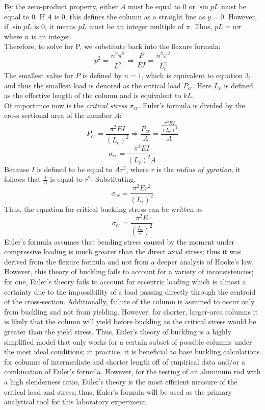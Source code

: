 \documentclass{article}
\begin{document}
    By the zero-product property, either $A$ must be equal to 0 or $\sin pL$ must be equal to 0. If $A$ is 0, this defines the column as a straight line as $y=0$. However, if $\sin pL$ is 0, it means $pL$ must be an integer multiple of $\pi$. Thus, $pL = n \pi$ where $n$ is an integer. \\
    Therefore, to solve for P, we substitute back into the flexure formula:
    \[ p^2 = \frac{n^2 \pi^2}{L^2} \Rightarrow \frac{P}{EI} = \frac{n^2 \pi^2}{L_{e}^2}\]
    The smallest value for $P$ is defined by $n = 1$, which is equivalent to equation 3, and thus the smallest load is denoted as the critical load $P_{cr}$. Here $L_{e}$ is defined as the effective length of the column and is equivalent to $kL$.\\
    Of importance now is the \emph{critical stress} $\sigma_{cr}$. Euler's formula is divided by the cross sectional area of the member $A$: 
    \[P_{cr} = \frac{\pi^2 E I}{(L_e)^2} \Rightarrow \frac{P_{cr}}{A} = \frac{\frac{\pi^2 E I}{(L_e)^2}}{A}\]
    \[\sigma_{cr} = \frac{\pi^2 E I}{(L_e)^2 A}\]
    Because $I$ is defined to be equal to $A r^2$, where $r$ is the \emph{radius of gyration}, it follows that $\frac{I}{A}$ is equal to $r^2$. Substituting,
    \[\sigma_{cr} = \frac{\pi^2 E r^2}{(L_e)^2 }\]
    Thus, the equation for critical buckling stress can be written as
    \begin{equation}
        \sigma_{cr} = \frac{\pi^2 E}{(\frac{L_e}{r})^2}
    \end{equation}
    Euler's formula assumes that bending stress caused by the moment under compressive loading is much greater than the direct axial stress; thus it was derived from the flexure formula and not from a deeper analysis of Hooke's law. However, this theory of buckling fails to account for a variety of inconsistencies; for one, Euler's theory fails to account for eccentric loading which is almost a certainty due to the impossibility of a load passing directly through the centroid of the cross-section. Additionally, failure of the column is assumed to occur only from buckling and not from yielding. However, for shorter, larger-area columns it is likely  that the column will yield before buckling as the critical stress would be greater than the yield stress. Thus, Euler's theory of buckling is a highly simplified model that only works for a certain subset of possible columns under the most ideal conditions; in practice, it is beneficial to base buckling calculations for columns of intermediate and shorter length off of empirical data and/or a combination of Euler's formula. However, for the testing of an aluminum rod with a high slenderness ratio, Euler's theory is the most efficient measure of the critical load and stress; thus, Euler's formula will be used as the primary analytical tool for this laboratory experiment. 
\end{document}
